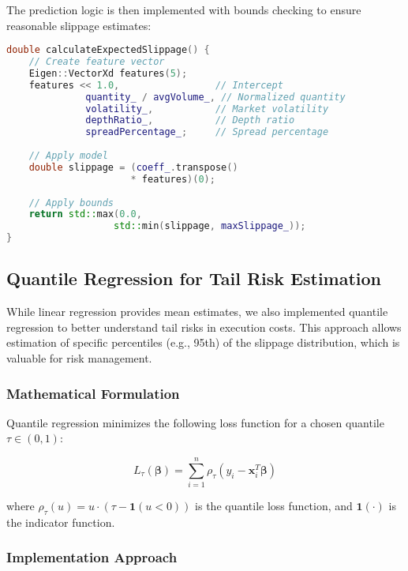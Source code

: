 \documentclass[10pt,twocolumn,a4paper]{IEEEtran}
\begin{document}
The prediction logic is then implemented with bounds checking to ensure reasonable slippage estimates:

\begin{lstlisting}[language=C++, caption=Slippage Prediction Implementation]
double calculateExpectedSlippage() {
    // Create feature vector
    Eigen::VectorXd features(5);
    features << 1.0,                 // Intercept
              quantity_ / avgVolume_, // Normalized quantity
              volatility_,           // Market volatility
              depthRatio_,           // Depth ratio
              spreadPercentage_;     // Spread percentage
               
    // Apply model
    double slippage = (coeff_.transpose() 
                      * features)(0);
    
    // Apply bounds
    return std::max(0.0, 
                   std::min(slippage, maxSlippage_));
}
\end{lstlisting}

\subsection{Quantile Regression for Tail Risk Estimation}

While linear regression provides mean estimates, we also implemented quantile regression to better understand tail risks in execution costs. This approach allows estimation of specific percentiles (e.g., 95th) of the slippage distribution, which is valuable for risk management.

\subsubsection{Mathematical Formulation}

Quantile regression minimizes the following loss function for a chosen quantile $\tau \in (0,1)$:

\begin{equation}
L_{\tau}(\mathbf{\beta}) = \sum_{i=1}^n \rho_{\tau}(y_i - \mathbf{x}_i^T\mathbf{\beta})
\end{equation}

where $\rho_{\tau}(u) = u \cdot (\tau - \mathbf{1}(u < 0))$ is the quantile loss function, and $\mathbf{1}(\cdot)$ is the indicator function.

\subsubsection{Implementation Approach}
\end{document}
